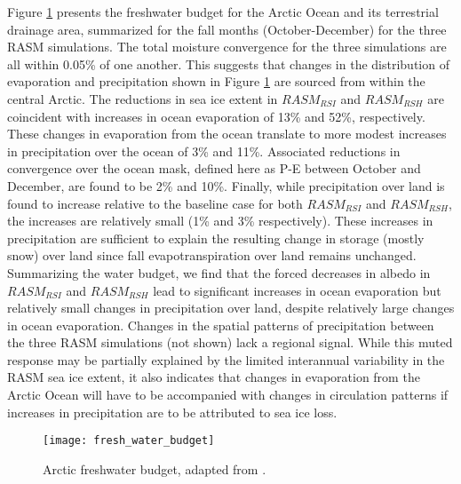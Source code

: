 Figure \ref{fig:fwb} presents the freshwater budget for the Arctic Ocean and its terrestrial drainage area, summarized for the fall months (October-December) for the three RASM simulations.
The total moisture convergence for the three simulations are all within 0.05\% of one another.
This suggests that changes in the distribution of evaporation and precipitation shown in Figure \ref{fig:fwb} are sourced from within the central Arctic.
The reductions in sea ice extent in $RASM_{RSI}$ and $RASM_{RSH}$ are coincident with increases in ocean evaporation of 13\% and 52\%, respectively.
These changes in evaporation from the ocean translate to more modest increases in precipitation over the ocean of 3\% and 11\%.
Associated reductions in convergence over the ocean mask, defined here as P-E between October and December, are found to be 2\% and 10\%. %
Finally, while precipitation over land is found to increase relative to the baseline case for both $RASM_{RSI}$ and $RASM_{RSH}$, the increases are relatively small (1\% and 3\% respectively).
These increases in precipitation are sufficient to explain the resulting change in storage (mostly snow) over land since fall evapotranspiration over land remains unchanged. %
Summarizing the water budget, we find that the forced decreases in albedo in $RASM_{RSI}$ and $RASM_{RSH}$ lead to significant increases in ocean evaporation but relatively small changes in precipitation over land, despite relatively large changes in ocean evaporation.
Changes in the spatial patterns of precipitation between the three RASM simulations (not shown) lack a regional signal.
While this muted response may be partially explained by the limited interannual variability in the RASM sea ice extent, it also indicates that changes in evaporation from the Arctic Ocean will have to be accompanied with changes in circulation patterns if increases in precipitation are to be attributed to sea ice loss.

\begin{figure}
  \centering
  \texttt{[image: fresh\_water\_budget]}
  \caption{Arctic freshwater budget, adapted from \citet{Serreze_2006a}.}
  \label{fig:fwb}
\end{figure}

